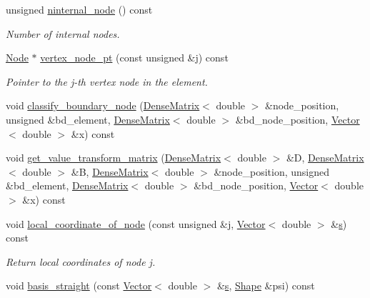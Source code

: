 \begin{DoxyCompactItemize}
unsigned \hyperlink{classoomph_1_1C1CurvedElement_3_012_00_01NNODE__1D_01_4_a038bf547d8348358f795f52cd3b7fb99}{ninternal\+\_\+node} () const
\begin{DoxyCompactList}\small\item\em Number of internal nodes. \end{DoxyCompactList}\item 
\hyperlink{classoomph_1_1Node}{Node} $\ast$ \hyperlink{classoomph_1_1C1CurvedElement_3_012_00_01NNODE__1D_01_4_a0fe82acd4ccebb368f96c657927063c8}{vertex\+\_\+node\+\_\+pt} (const unsigned \&j) const
\begin{DoxyCompactList}\small\item\em Pointer to the j-\/th vertex node in the element. \end{DoxyCompactList}\item 
void \hyperlink{classoomph_1_1C1CurvedElement_3_012_00_01NNODE__1D_01_4_ab7642a52d95f8b554f614b6fc5710a35}{classify\+\_\+boundary\+\_\+node} (\hyperlink{classoomph_1_1DenseMatrix}{Dense\+Matrix}$<$ double $>$ \&node\+\_\+position, unsigned \&bd\+\_\+element, \hyperlink{classoomph_1_1DenseMatrix}{Dense\+Matrix}$<$ double $>$ \&bd\+\_\+node\+\_\+position, \hyperlink{classoomph_1_1Vector}{Vector}$<$ double $>$ \&x) const
\item 
void \hyperlink{classoomph_1_1C1CurvedElement_3_012_00_01NNODE__1D_01_4_a4cb17f4e7f9253ff739a6102f1f39158}{get\+\_\+value\+\_\+transform\+\_\+matrix} (\hyperlink{classoomph_1_1DenseMatrix}{Dense\+Matrix}$<$ double $>$ \&D, \hyperlink{classoomph_1_1DenseMatrix}{Dense\+Matrix}$<$ double $>$ \&B, \hyperlink{classoomph_1_1DenseMatrix}{Dense\+Matrix}$<$ double $>$ \&node\+\_\+position, unsigned \&bd\+\_\+element, \hyperlink{classoomph_1_1DenseMatrix}{Dense\+Matrix}$<$ double $>$ \&bd\+\_\+node\+\_\+position, \hyperlink{classoomph_1_1Vector}{Vector}$<$ double $>$ \&x) const
\item 
void \hyperlink{classoomph_1_1C1CurvedElement_3_012_00_01NNODE__1D_01_4_a155a6dffffa34a092753697098bafb57}{local\+\_\+coordinate\+\_\+of\+\_\+node} (const unsigned \&j, \hyperlink{classoomph_1_1Vector}{Vector}$<$ double $>$ \&\hyperlink{cfortran_8h_ab7123126e4885ef647dd9c6e3807a21c}{s}) const
\begin{DoxyCompactList}\small\item\em Return local coordinates of node j. \end{DoxyCompactList}\item 
void \hyperlink{classoomph_1_1C1CurvedElement_3_012_00_01NNODE__1D_01_4_a68d0f04ce0ead20ed00c0925e2ac89db}{basis\+\_\+straight} (const \hyperlink{classoomph_1_1Vector}{Vector}$<$ double $>$ \&\hyperlink{cfortran_8h_ab7123126e4885ef647dd9c6e3807a21c}{s}, \hyperlink{classoomph_1_1Shape}{Shape} \&psi) const

\end{DoxyCompactItemize}
